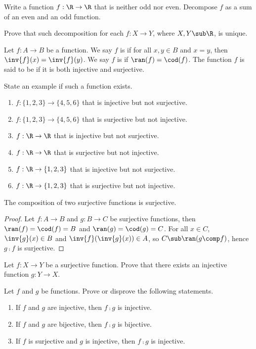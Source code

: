 \documentclass[10pt]{article}
\begin{document}
\begin{problem}
    Write a function $f:\R\to\R$ that is neither odd nor even. Decompose $f$ as a sum of an even and an odd function.
\end{problem}
\begin{problem}
    Prove that such decomposition for each $f:X\to Y$, where $X,Y\sub\R$, is unique.
\end{problem}
\begin{definition}
    Let $f:A\to B$ be a function. We say $f$ is  if for all $x,y\in B$ and $x=y$, then $\inv{f}(x)=\inv{f}(y)$. We say $f$ is  if $\ran(f)=\cod(f)$. The function $f$ is said to be  if it is both injective and surjective.
\end{definition}
\begin{problem}
    State an example if such a function exists.
    \begin{enumerate}
        \item $f:\{1,2,3\}\to\{4,5,6\}$ that is injective but not surjective.
        \item $f:\{1,2,3\}\to\{4,5,6\}$ that is surjective but not injective.
        \item $f:\R\to\R$ that is injective but not surjective.
        \item $f:\R\to\R$ that is surjective but not injective.
        \item $f:\R\to\{1,2,3\}$ that is injective but not surjective.
        \item $f:\R\to\{1,2,3\}$ that is surjective but not injective.
    \end{enumerate}
\end{problem}
\begin{proposition}
    The composition of two surjective functions is surjective.
\end{proposition}
\begin{proof}
    Let $f:A\to B$ and $g:B\to C$ be surjective functions, then $\ran(f)=\cod(f)=B$ and $\ran(g)=\cod(g)=C$. For all $x\in C$, $\inv{g}(x)\in B$ and $\inv{f}(\inv{g}(x))\in A$, so $C\sub\ran(g\comp f)$, hence $g\comp f$ is surjective.
\end{proof}
\begin{problem}
    Let $f:X\to Y$ be a surjective function. Prove that there exists an injective function $g:Y\to X$.
\end{problem}
\begin{problem}
    Let $f$ and $g$ be functions. Prove or disprove the following statements.
    \begin{enumerate}
        \item If $f$ and $g$ are injective, then $f\comp g$ is injective. 
        \item If $f$ and $g$ are bijective, then $f\comp g$ is bijective.
        \item If $f$ is surjective and $g$ is injective, then $f\comp g$ is injective.
    \end{enumerate}
\end{problem}
\end{document}
